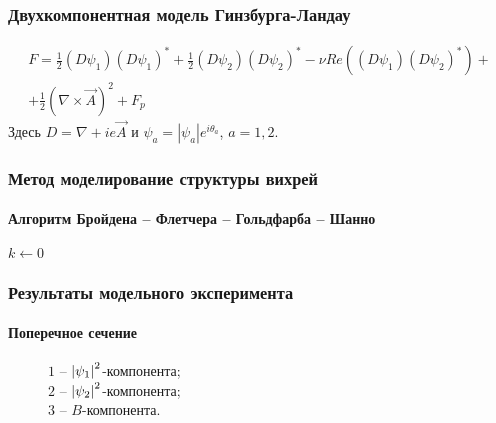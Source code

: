 \begin{frame}
    \frametitle{Двухкомпонентная модель Гинзбурга-Ландау}
    \begin{gather}
        F = \frac{1}{2}(D\psi_1)(D\psi_1)^* + 
            \frac{1}{2}(D\psi_2)(D\psi_2)^* -
            \nu Re\left( (D\psi_1)(D\psi_2)^* \right) + \nonumber \\ +
            \frac{1}{2}\left(\nabla\times\vec{A}\right)^2 + F_p
        \nonumber
    \end{gather}
    Здесь \( D = \nabla + ie\vec{A} \) и \( \psi_a = |\psi_a|e^{i\theta_a} \), 
    \( a = 1,2 \).
\end{frame}

\begin{frame}
    \frametitle{Метод моделирование структуры вихрей}
    \framesubtitle{Алгоритм Бройдена -- Флетчера -- Гольдфарба -- Шанно}
    \begin{center}
        \begin{minipage}{2in}
            \begin{algorithm}[H]
                \scriptsize
                \SetAlgoLined
                $k \gets 0$\;
            \end{algorithm}
        \end{minipage}
    \end{center}
\end{frame}

\begin{frame}
    \frametitle{Результаты модельного эксперимента}
    \framesubtitle{Поперечное сечение}
    \begin{figure}[h]
        \begin{minipage}[h]{0.49\linewidth}
        \end{minipage}
        \hfill
        \begin{minipage}[h]{0.49\linewidth}
            \( 1 \) -- \( \left| \psi_1 \right|^2 \)-компонента; \\ 
            \( 2 \) -- \( \left| \psi_2 \right|^2 \)-компонента;\\
            \( 3 \) -- \( B \)-компонента.
        \end{minipage}
    \end{figure}
\end{frame}

